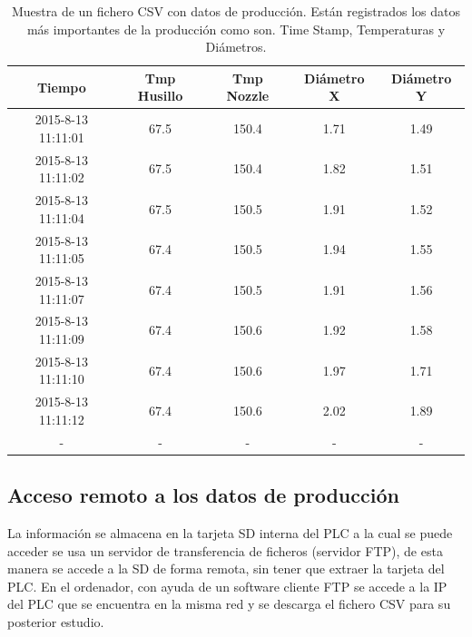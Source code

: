 \begin{table}[H]
    \centering
    \begin{tabular}{ccccc}
        {\bf Tiempo}         & {\bf Tmp Husillo} & {\bf Tmp Nozzle} & {\bf Diámetro X} & {\bf Diámetro Y} \\ \hline
        2015-8-13 11:11:01  & 67.5              & 150.4            & 1.71         & 1.49         \\
        2015-8-13 11:11:02  & 67.5              & 150.4            & 1.82         & 1.51         \\
        2015-8-13 11:11:04  & 67.5              & 150.5            & 1.91         & 1.52         \\
        2015-8-13 11:11:05  & 67.4              & 150.5            & 1.94         & 1.55         \\
        2015-8-13 11:11:07  & 67.4              & 150.5            & 1.91         & 1.56         \\
        2015-8-13 11:11:09  & 67.4              & 150.6            & 1.92         & 1.58         \\
        2015-8-13 11:11:10 & 67.4              & 150.6             & 1.97          & 1.71         \\
        2015-8-13 11:11:12 & 67.4              & 150.6             & 2.02          & 1.89        \\
                -          &    -              & -                & -                & -
    \end{tabular}
    \caption[Muestra de un fichero CSV con datos de producción.]{Muestra de un fichero CSV con datos de producción. Están registrados los datos más importantes de la producción como son. Time Stamp, Temperaturas y Diámetros.}
    \label{tab:plc_csv}
\end{table}

\subsection{Acceso remoto a los datos de producción}
\label{sec:plc_scada}

La información se almacena en la tarjeta SD interna del PLC a la cual se puede acceder se usa un servidor de transferencia de ficheros (servidor FTP), de esta manera se accede a la SD de forma remota, sin tener que extraer la tarjeta del PLC. En el ordenador, con ayuda de un software cliente FTP se accede a la IP del PLC que se encuentra en la misma red y se descarga el fichero CSV para su posterior estudio.\\

